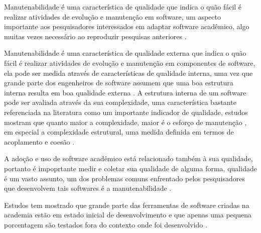 
Manutenabilidade é uma característica de qualidade que indica o quão fácil é
realizar atividades de evolução e manutenção em software, um aspecto
importante aos pesquisadores interessados em adaptar software acadêmico, algo
muitas vezes necessário ao reproduzir pesquisas anteriores \cite{Peng2011}.

Manutenabilidade é uma característica de qualidade externa que indica o quão
fácil é realizar atividades de evolução e manutenção em componentes de
software, ela pode ser medida através de características de qualidade interna,
uma vez que grande parte dos engenheiros de software assumem que uma boa
estrutura interna resulta em boa qualidade externa \cite{Fenton2014}. A
estrutura interna de um software pode ser avaliada através da sua complexidade,
uma característica bastante referenciada na literatura como um importante
indicador de qualidade, estudos mostram que quanto maior a complexidade, maior
é o esforço de manutenção \cite{hashim1996software, Darcy2005}, em especial a
complexidade estrutural, uma medida definida em termos de acoplamento e coesão
\cite{Terceiro2012}.

A adoção e uso de software acadêmico está relacionado
também à sua qualidade, portanto é impoprtante medir e coletar sua qualidade de
alguma forma, qualidade é um vasto assunto, um dos problemas comuns enfrentado
pelos pesquisadores que desenvolvem tais softwares é a manutenabilidade
\cite{Prlic2012}.

Estudos tem mostrado que grande parte das ferramentas de software criadas na
academia estão em estado inicial de desenvolvimento \cite{marshall2013tools} e
que apenas uma pequena porcentagem são testados fora do contexto onde foi
desenvolvido \cite{Portillo12}.




